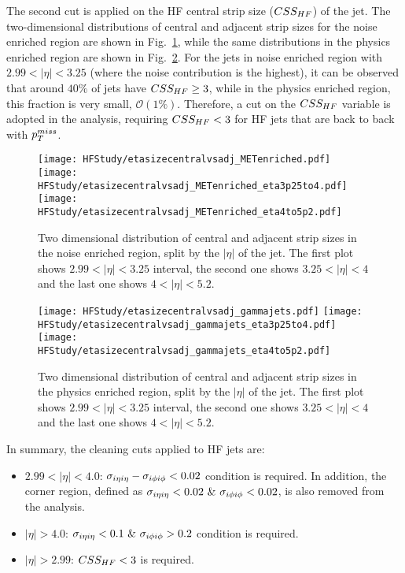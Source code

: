 The second cut is applied on the HF central strip size ($CSS_{HF}$) of the jet. The two-dimensional distributions of central and adjacent strip sizes for the noise enriched
region are shown in Fig.~\ref{fig:stripsize_noise_enriched}, while the same distributions in the physics enriched region are shown in Fig.~\ref{fig:stripsize_phys_enriched}.
For the jets in noise enriched region with $2.99 < |\eta| < 3.25$ (where the noise contribution is the highest), it can be observed that around $40\%$ of jets
have $CSS_{HF} \geq 3$, while in the physics enriched region, this fraction is very small, $\mathcal{O}(1\%)$. Therefore, a cut on the $CSS_{HF}$ variable is adopted in 
the analysis, requiring $CSS_{HF} < 3$ for HF jets that are back to back with $p_T^{miss}$. 

\begin{figure}
    \centering
    \texttt{[image: HFStudy/etasizecentralvsadj\_METenriched.pdf]}
    \texttt{[image: HFStudy/etasizecentralvsadj\_METenriched\_eta3p25to4.pdf]}
    \texttt{[image: HFStudy/etasizecentralvsadj\_METenriched\_eta4to5p2.pdf]}
    \caption{Two dimensional distribution of central and adjacent strip sizes in the noise enriched region, split by the $|\eta|$ of the jet. The first plot shows 
    $2.99 < |\eta| < 3.25$ interval, the second one shows $3.25 < |\eta| < 4$ and the last one shows $4 < |\eta| < 5.2$.}
    \label{fig:stripsize_noise_enriched}
\end{figure}

\begin{figure}
    \centering
    \texttt{[image: HFStudy/etasizecentralvsadj\_gammajets.pdf]}
    \texttt{[image: HFStudy/etasizecentralvsadj\_gammajets\_eta3p25to4.pdf]}
    \texttt{[image: HFStudy/etasizecentralvsadj\_gammajets\_eta4to5p2.pdf]}
    \caption{Two dimensional distribution of central and adjacent strip sizes in the physics enriched region, split by the $|\eta|$ of the jet. The first plot shows 
    $2.99 < |\eta| < 3.25$ interval, the second one shows $3.25 < |\eta| < 4$ and the last one shows $4 < |\eta| < 5.2$.}
    \label{fig:stripsize_phys_enriched}
\end{figure}


In summary, the cleaning cuts applied to HF jets are:
\begin{itemize}
    \item $2.99 < |\eta| < 4.0$: $\sigma_{i\eta i\eta} - \sigma_{i\phi i\phi} < 0.02$ condition is required. In addition, the corner region, defined as $\sigma_{i\eta i\eta} < 0.02 \ \& \ \sigma_{i\phi i\phi} < 0.02$,
    is also removed from the analysis.
    \item $|\eta| > 4.0$: $\sigma_{i\eta i\eta} < 0.1 \ \& \ \sigma_{i\phi i\phi} > 0.2$ condition is required.
    \item $|\eta| > 2.99$: $CSS_{HF} < 3$ is required.
\end{itemize}

